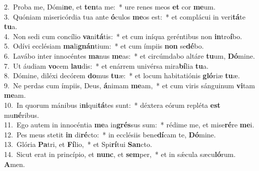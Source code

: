 {2.~}Proba me, Dómi\textbf{ne}, et \textbf{ten}ta me:~* ure renes meos \textbf{et} cor \textbf{me}um.\\
{3.~}Quóniam misericórdia tua ante \textbf{ó}culos \textbf{me}os est:~* et complácui in veri\textbf{tá}te \textbf{tu}a.\\
{4.~}Non sedi cum concílio \textbf{va}ni\textbf{tá}tis:~* et cum iníqua geréntibus non \textbf{in}tro\textbf{í}bo.\\
{5.~}Odívi ecclésiam \textbf{ma}li\textbf{gnán}tium:~* et cum ímpiis \textbf{non} se\textbf{dé}bo.\\
{6.~}Lavábo inter innocéntes \textbf{ma}nus \textbf{me}as:~* et circúmdabo altáre \textbf{tu}um, \textbf{Dó}mine.\\
{7.~}Ut áudiam \textbf{vo}cem \textbf{lau}dis:~* et enárrem univérsa mira\textbf{bí}lia \textbf{tu}a.\\
{8.~}Dómine, diléxi decórem \textbf{do}mus \textbf{tu}æ:~* et locum habitatiónis \textbf{gló}riæ \textbf{tu}æ.\\
{9.~}Ne perdas cum ímpiis, Deus, \textbf{á}nimam \textbf{me}am,~* et cum viris sánguinum \textbf{vi}tam \textbf{me}am.\\
{10.~}In quorum mánibus i\textbf{ni}qui\textbf{tá}tes sunt:~* déxtera eórum repléta \textbf{est} mu\textbf{né}ribus.\\
{11.~}Ego autem in innocéntia \textbf{me}a in\textbf{grés}sus sum:~* rédime me, et mise\textbf{ré}re \textbf{me}i.\\
{12.~}Pes meus stetit \textbf{in} di\textbf{ré}cto:~* in ecclésiis bene\textbf{dí}cam te, \textbf{Dó}mine.\\
{13.~}Glória \textbf{Pa}tri, et \textbf{Fí}lio,~* et Spi\textbf{rí}tui \textbf{San}cto.\\
{14.~}Sicut erat in princípio, et \textbf{nunc}, et \textbf{sem}per,~* et in sǽcula sæcu\textbf{ló}rum. \textbf{A}men.\\
